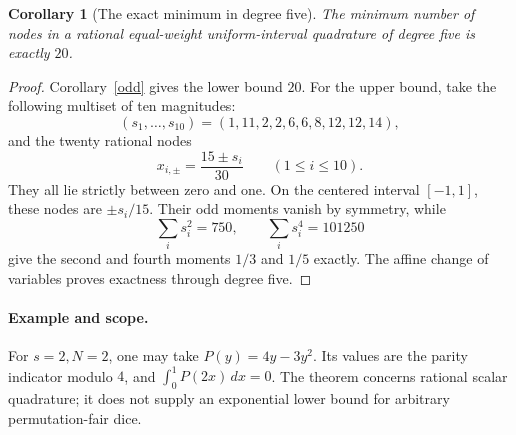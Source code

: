 \documentclass[11pt]{article}
\newtheorem{corollary}[theorem]{Corollary}
\begin{document}
\begin{corollary}[The exact minimum in degree five]
The minimum number of nodes in a rational equal-weight uniform-interval
quadrature of degree five is exactly $20$.
\end{corollary}
\begin{proof}
Corollary~\ref{odd} gives the lower bound $20$.
For the upper bound, take the following multiset of ten magnitudes:
\[
 (s_1,\ldots,s_{10})=(1,11,2,2,6,6,8,12,12,14),
\]
and the twenty rational nodes
\[
 x_{i,\pm}=\frac{15\pm s_i}{30}\qquad(1\le i\le10).
\]
They all lie strictly between zero and one.
On the centered interval $[-1,1]$, these nodes are $\pm s_i/15$.
Their odd moments vanish by symmetry, while
\[
 \sum_i s_i^2=750,\qquad \sum_i s_i^4=101250
\]
give the second and fourth moments $1/3$ and $1/5$ exactly.
The affine change of variables proves exactness through degree five.
\end{proof}

\paragraph{Example and scope.}
For $s=2,N=2$, one may take $P(y)=4y-3y^2$.
Its values are the parity indicator modulo $4$, and
$\int_0^1P(2x)\,dx=0$.
The theorem concerns rational scalar quadrature; it does not supply an
exponential lower bound for arbitrary permutation-fair dice.
\end{document}
